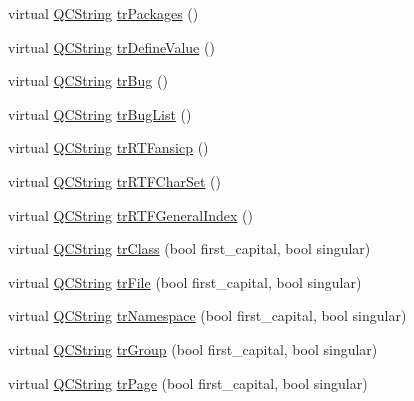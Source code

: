 \begin{DoxyCompactItemize}
\item 
virtual \mbox{\hyperlink{class_q_c_string}{Q\+C\+String}} \mbox{\hyperlink{class_translator_croatian_a30ab02a12a1ff7ec6f1b92b9e68ea3b2}{tr\+Packages}} ()
\item 
virtual \mbox{\hyperlink{class_q_c_string}{Q\+C\+String}} \mbox{\hyperlink{class_translator_croatian_a5d68bbda24085c02918a1cd967a6d4cd}{tr\+Define\+Value}} ()
\item 
virtual \mbox{\hyperlink{class_q_c_string}{Q\+C\+String}} \mbox{\hyperlink{class_translator_croatian_a75fb4c2b60df30469878834f02dae136}{tr\+Bug}} ()
\item 
virtual \mbox{\hyperlink{class_q_c_string}{Q\+C\+String}} \mbox{\hyperlink{class_translator_croatian_a95d42281050b16f36d7e7b260c53f8e3}{tr\+Bug\+List}} ()
\item 
virtual \mbox{\hyperlink{class_q_c_string}{Q\+C\+String}} \mbox{\hyperlink{class_translator_croatian_ac17499fef00a33227b0b863cb3794ffa}{tr\+R\+T\+Fansicp}} ()
\item 
virtual \mbox{\hyperlink{class_q_c_string}{Q\+C\+String}} \mbox{\hyperlink{class_translator_croatian_a1d7d6ab4fe3d62e5eaf1060da020cca2}{tr\+R\+T\+F\+Char\+Set}} ()
\item 
virtual \mbox{\hyperlink{class_q_c_string}{Q\+C\+String}} \mbox{\hyperlink{class_translator_croatian_ad6f887a03290a0f091c66dce049629c0}{tr\+R\+T\+F\+General\+Index}} ()
\item 
virtual \mbox{\hyperlink{class_q_c_string}{Q\+C\+String}} \mbox{\hyperlink{class_translator_croatian_a152e3ac2d8c5f9fe28436d323d15bf8f}{tr\+Class}} (bool first\+\_\+capital, bool singular)
\item 
virtual \mbox{\hyperlink{class_q_c_string}{Q\+C\+String}} \mbox{\hyperlink{class_translator_croatian_a963510e90a33b2707c9fffc45ff7cc09}{tr\+File}} (bool first\+\_\+capital, bool singular)
\item 
virtual \mbox{\hyperlink{class_q_c_string}{Q\+C\+String}} \mbox{\hyperlink{class_translator_croatian_ab74e2ae74b6acaec10f1cb15f6bb5c4f}{tr\+Namespace}} (bool first\+\_\+capital, bool singular)
\item 
virtual \mbox{\hyperlink{class_q_c_string}{Q\+C\+String}} \mbox{\hyperlink{class_translator_croatian_ae2e59a38e3ee83ff4e28a89bc9ec7291}{tr\+Group}} (bool first\+\_\+capital, bool singular)
\item 
virtual \mbox{\hyperlink{class_q_c_string}{Q\+C\+String}} \mbox{\hyperlink{class_translator_croatian_ae4121bb290db310efb73193303ae09b3}{tr\+Page}} (bool first\+\_\+capital, bool singular)

\end{DoxyCompactItemize}
